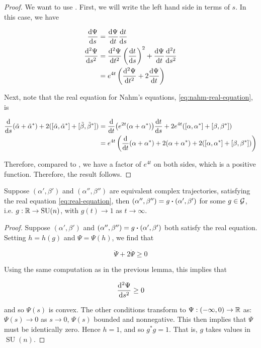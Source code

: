 \documentclass{report}
\DeclareMathOperator{\SU}{SU}
\begin{document}
\begin{proof}
    We want to use \cite[Lemma 2.10]{donaldson_nahms_1984}. First, we will write the left hand side in terms of \(s\). In this case, we have

    \begin{align*}
        \dv{\Psi}{s} &= \dv{\Psi}{t}\dv{t}{s} \\
        \dv[2]{\Psi}{s} &= \dv[2]{\Psi}{t}\left(\dv{t}{s}\right)^2 + \dv{\Psi}{t}\dv[2]{t}{s} \\
        &= e^{4t}\left(\dv[2]{\Psi}{t} + 2\dv{\Psi}{t}\right) 
    \end{align*}

    Next, note that the real equation for Nahm's equations, \cref{eq:nahm-real-equation}, is

    \begin{align*}
        \dv{s}(\tilde\alpha + \tilde\alpha^*) + 2([\tilde\alpha, \tilde\alpha^*] + [\tilde\beta, \tilde\beta^*]) &=\dv{t}(e^{2t}(\alpha + \alpha^*))\dv{t}{s} + 2e^{4t}([\alpha, \alpha^*] + [\beta, \beta^*]) \\
        &= e^{4t}\left(\dv{t}(\alpha + \alpha^*) + 2(\alpha + \alpha^*) + 2([\alpha, \alpha^*] + [\beta, \beta^*])\right)
    \end{align*}

    Therefore, compared to \cite[Lemma 2.10]{donaldson_nahms_1984}, we have a factor of \(e^{4t}\) on both sides, which is a positive function. Therefore, the result follows.
\end{proof}

\begin{proposition}
    \label{prop:real-equation-uniqueness}
    Suppose \((\alpha', \beta')\) and \((\alpha'', \beta'')\) are equivalent complex trajectories, satisfying the real equation \cref{eq:real-equation}, then \((\alpha'', \beta'') = g\vdot(\alpha', \beta')\) for some \(g \in \mathcal{G}\), i.e. \(g : \R \to \SU(n)\), with \(g(t) \to 1\) as \(t \to \infty\).
\end{proposition}

\begin{proof}
    Suppose \((\alpha', \beta')\) and \((\alpha'', \beta'') = g\vdot(\alpha', \beta')\) both satisfy the real equation. Setting \(h = h(g)\) and \(\Psi = \Psi(h)\), we find that

    \[\ddot \Psi + 2\dot\Psi \ge 0\]

    Using the same computation as in the previous lemma, this implies that

    \[\dv[2]{\Psi}{s} \ge 0\]

    and so \(\Psi(s)\) is convex. The other conditions transform to \(\Psi : (-\infty, 0) \to \mathbb{R}\) as: \(\Psi(s) \to 0\) as \(s \to 0\), \(\Psi(s)\) bounded and nonnegative. This then implies that \(\Psi\) must be identically zero. Hence \(h = 1\), and so \(g^*g = 1\). That is, \(g\) takes values in \(\SU(n)\).
\end{proof}
\end{document}
